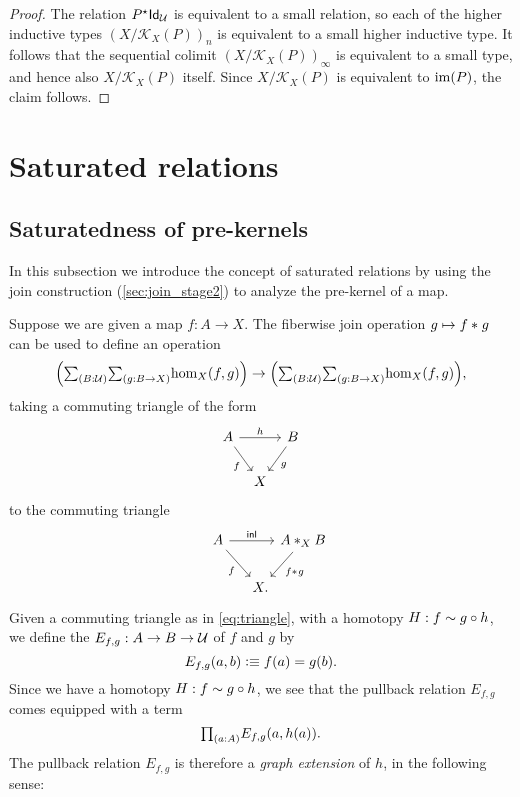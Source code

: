 \begin{proof}
The relation $P^\star\mathsf{Id}_{\mathcal{U}}$ is equivalent to a small relation, so each of the higher inductive types $(X/\mathcal{K}_X(P))_n$ is equivalent to a small higher inductive type. It follows that the sequential colimit $(X/\mathcal{K}_X(P))_\infty$ is equivalent to a small type, and hence also $X/\mathcal{K}_X(P)$ itself. Since $X/\mathcal{K}_X(P)$ is equivalent to $\operatorname{im}(P)$, the claim follows.
\end{proof}

\section{Saturated relations}

\subsection{Saturatedness of pre-kernels}
In this subsection we introduce the concept of saturated relations by using the join construction (\cref{sec:join_stage2}) to analyze the pre-kernel of a map.

Suppose we are given a map $f:A\to X$. The fiberwise join operation $g\mapsto {f}\ast_{}{g}$  can be used to define an operation
\begin{equation*}
\Big(\sm{B:\UU}{g:B\to X}\mathrm{hom}_X(f,g)\Big)\to\Big(\sm{B:\UU}{g:B\to X}\mathrm{hom}_X(f,g)\Big),
\end{equation*}
taking a commuting triangle of the form
\begin{equation}\label{eq:triangle}
\begin{tikzcd}[column sep=tiny]
A \arrow[dr,swap,"f"] \arrow[rr,"h"] & & B \arrow[dl,"g"] \\
\phantom{B} & X & \phantom{A}
\end{tikzcd}
\end{equation}
to the commuting triangle
\begin{equation*}
\begin{tikzcd}[column sep=0]
A \arrow[dr,swap,"f"] \arrow[rr,"\inl"] & & \join[X]{A}{B} \arrow[dl,"\join{f}{g}"] \\
\phantom{\join[X]{A}{B}} & X.
\end{tikzcd}
\end{equation*}
Given a commuting triangle as in \cref{eq:triangle}, with a homotopy $H:f\sim g\circ h$, we define the  $E_{f,g}:A\to B\to \mathcal{U}$ of $f$ and $g$ by
\begin{equation*}
E_{f,g}(a,b)\vcentcolon\equiv f(a)=g(b).
\end{equation*}
Since we have a homotopy $H:f\sim g\circ h$, we see that the pullback relation $E_{f,g}$ comes equipped with a term
\begin{equation*}
\prd{a:A}E_{f,g}(a,h(a)).
\end{equation*}
The pullback relation $E_{f,g}$ is therefore a \emph{graph extension} of $h$, in the following sense:

